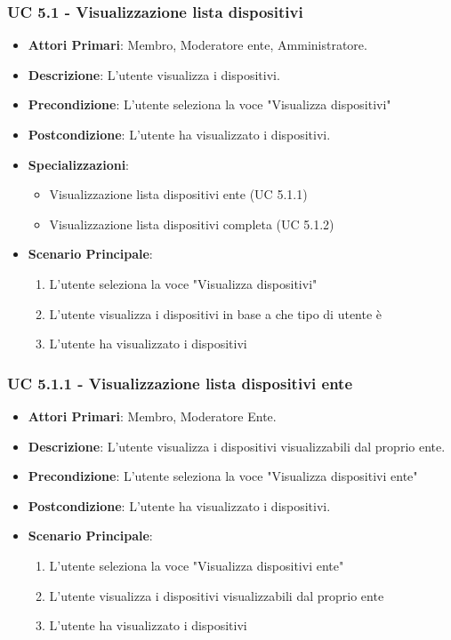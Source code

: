 			\subsubsection{UC 5.1 - Visualizzazione lista dispositivi}
			\begin{itemize}
				\item \textbf{Attori Primari}: Membro, Moderatore ente, Amministratore.
				\item \textbf{Descrizione}: L'utente visualizza i dispositivi.
				\item \textbf{Precondizione}: L'utente seleziona la voce "Visualizza dispositivi"
				\item \textbf{Postcondizione}: L'utente ha visualizzato i dispositivi.
				\item \textbf{Specializzazioni}:
				\begin{itemize}
					\item Visualizzazione lista dispositivi ente (UC 5.1.1)
					\item Visualizzazione lista dispositivi completa (UC 5.1.2)
				\end{itemize}
				\item \textbf{Scenario Principale}:
				\begin{enumerate}
					\item{L'utente seleziona la voce "Visualizza dispositivi"}
					\item{L'utente visualizza i dispositivi in base a che tipo di utente è}
					\item{L'utente ha visualizzato i dispositivi}
				\end{enumerate}
			\end{itemize}
			
			\subsubsection{UC 5.1.1 - Visualizzazione lista dispositivi ente}
			\begin{itemize}
				\item \textbf{Attori Primari}: Membro, Moderatore Ente.
				\item \textbf{Descrizione}: L'utente visualizza i dispositivi visualizzabili dal proprio ente.
				\item \textbf{Precondizione}: L'utente seleziona la voce "Visualizza dispositivi ente"
				\item \textbf{Postcondizione}: L'utente ha visualizzato i dispositivi.
				\item \textbf{Scenario Principale}:
				\begin{enumerate}
					\item{L'utente seleziona la voce "Visualizza dispositivi ente"}
					\item{L'utente visualizza i dispositivi visualizzabili dal proprio ente}
					\item{L'utente ha visualizzato i dispositivi}
				\end{enumerate}
			\end{itemize}
			
